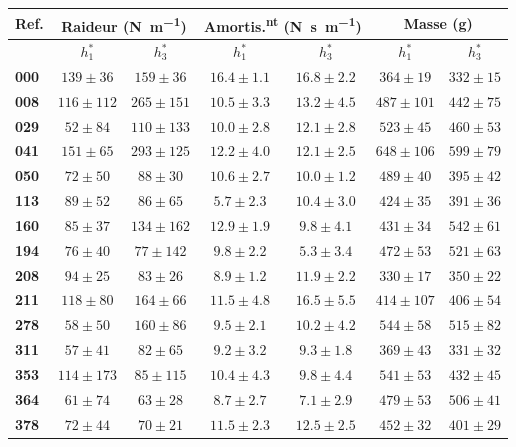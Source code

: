 \begin{appendices}
	\begin{tabular}{|l|c|c|c|c|c|c|}
		\hline
		\multicolumn{1}{|c|}{Ref.}&\multicolumn{2}{c|}{Raideur (\si{\newton\per\meter})} & \multicolumn{2}{c|}{Amortis.\textsuperscript{nt} (\si{\newton\second\per\meter})} & \multicolumn{2}{c|}{Masse (\si{\gram})}\\[2mm]
		\hline
		&$h_1^*$&$h_3^*$&$h_1^*$&$h_3^*$&$h_1^*$&$h_3^*$\\%
		\hline
		\textbf{000}&$139 \pm 36$&$159 \pm 36$&$16.4 \pm 1.1$&$16.8 \pm 2.2$&$364 \pm 19$&$332 \pm 15$\\\hline
		\textbf{008}&$116 \pm 112$&$265 \pm 151$&$10.5 \pm 3.3$&$13.2 \pm 4.5$&$487 \pm 101$&$442 \pm 75$\\\hline
		\textbf{029}&$52 \pm 84$&$110 \pm 133$&$10.0 \pm 2.8$&$12.1 \pm 2.8$&$523 \pm 45$&$460 \pm 53$\\\hline
		\textbf{041}&$151 \pm 65$&$293 \pm 125$&$12.2 \pm 4.0$&$12.1 \pm 2.5$&$648 \pm 106$&$599 \pm 79$\\\hline
		\textbf{050}&$72 \pm 50$&$88 \pm 30$&$10.6 \pm 2.7$&$10.0 \pm 1.2$&$489 \pm 40$&$395 \pm 42$\\\hline
		\textbf{113}&$89 \pm 52$&$86 \pm 65$&$5.7 \pm 2.3$&$10.4 \pm 3.0$&$424 \pm 35$&$391 \pm 36$\\\hline
		\textbf{160}&$85 \pm 37$&$134 \pm 162$&$12.9 \pm 1.9$&$9.8 \pm 4.1$&$431 \pm 34$&$542 \pm 61$\\\hline
		\textbf{194}&$76 \pm 40$&$77 \pm 142$&$9.8 \pm 2.2$&$5.3 \pm 3.4$&$472 \pm 53$&$521 \pm 63$\\\hline
		\textbf{208}&$94 \pm 25$&$83 \pm 26$&$8.9 \pm 1.2$&$11.9 \pm 2.2$&$330 \pm 17$&$350 \pm 22$\\\hline
		\textbf{211}&$118 \pm 80$&$164 \pm 66$&$11.5 \pm 4.8$&$16.5 \pm 5.5$&$414 \pm 107$&$406 \pm 54$\\\hline
		\textbf{278}&$58 \pm 50$&$160 \pm 86$&$9.5 \pm 2.1$&$10.2 \pm 4.2$&$544 \pm 58$&$515 \pm 82$\\\hline
		\textbf{311}&$57 \pm 41$&$82 \pm 65$&$9.2 \pm 3.2$&$9.3 \pm 1.8$&$369 \pm 43$&$331 \pm 32$\\\hline
		\textbf{353}&$114 \pm 173$&$85 \pm 115$&$10.4 \pm 4.3$&$9.8 \pm 4.4$&$541 \pm 53$&$432 \pm 45$\\\hline
		\textbf{364}&$61 \pm 74$&$63 \pm 28$&$8.7 \pm 2.7$&$7.1 \pm 2.9$&$479 \pm 53$&$506 \pm 41$\\\hline
		\textbf{378}&$72 \pm 44$&$70 \pm 21$&$11.5 \pm 2.3$&$12.5 \pm 2.5$&$452 \pm 32$&$401 \pm 29$\\\hline

\end{tabular}
\end{appendices}
